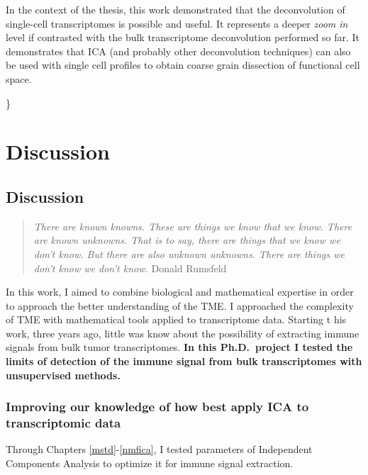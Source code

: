 \documentclass[12pt,]{book}
\theoremstyle{definition}
\theoremstyle{definition}
\theoremstyle{definition}
\theoremstyle{remark}
\begin{document}
In the context of the thesis, this work demonstrated that the
deconvolution of single-cell transcriptomes is possible and useful. It
represents a deeper \emph{zoom in} level if contrasted with the bulk
transcriptome deconvolution performed so far. It demonstrates that ICA
(and probably other deconvolution techniques) can also be used with
single cell profiles to obtain coarse grain dissection of functional
cell space.

\}

\hypertarget{part-discussion}{%
\part{Discussion}\label{part-discussion}}

\hypertarget{discussiongenerale}{%
\chapter{Discussion}\label{discussiongenerale}}

\begin{quote}
\emph{There are known knowns. These are things we know that we know.
There are known unknowns. That is to say, there are things that we know
we don't know. But there are also unknown unknowns. There are things we
don't know we don't know.} Donald Rumsfeld
\end{quote}

In this work, I aimed to combine biological and mathematical expertise
in order to approach the better understanding of the TME. I approached
the complexity of TME with mathematical tools applied to transcriptome
data. Starting t his work, three years ago, little was know about the
possibility of extracting immune signals from bulk tumor transcriptomes.
\textbf{In this Ph.D.~project I tested the limits of detection of the
immune signal from bulk transcriptomes with unsupervised methods.}

\hypertarget{improving-our-knowledge-of-how-best-apply-ica-to-transcriptomic-data}{%
\section{Improving our knowledge of how best apply ICA to transcriptomic
data}\label{improving-our-knowledge-of-how-best-apply-ica-to-transcriptomic-data}}

Through Chapters \ref{mstd}-\ref{nmfica}, I tested parameters of
Independent Components Analysis to optimize it for immune signal
extraction.
\end{document}
